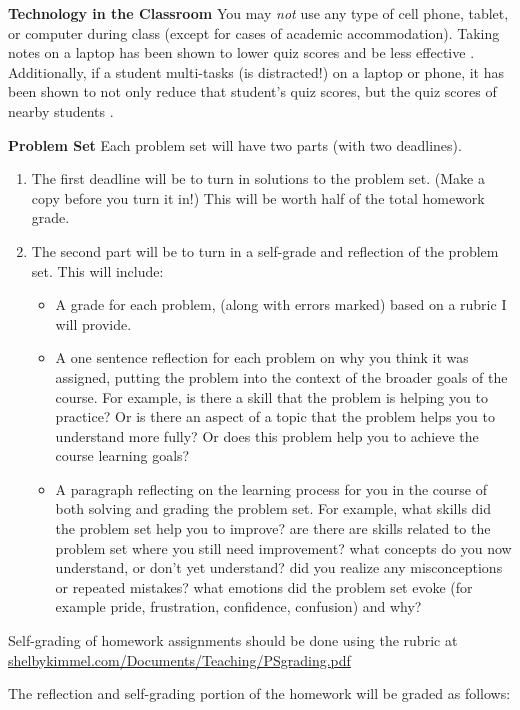 \documentclass[11pt]{article}
\begin{document}
\medskip
{\bf Technology in the Classroom} You may {\it not} use any type of cell phone, tablet, or computer during class (except for cases of academic accommodation). Taking notes on a laptop has been shown to lower quiz scores and be less effective \cite{doi:10.1177/0956797614524581}. Additionally, if a student multi-tasks (is distracted!) on a laptop or phone, it has been shown to not only reduce that student's quiz scores, but the quiz scores of nearby students \cite{Sana201324}.


\medskip

{\bf Problem Set} Each problem set will have two parts (with two deadlines).
\begin{enumerate}
\item The first deadline will be to turn in solutions to the problem set. (Make a copy before you turn it in!) This will be worth half of the total homework grade.
\item The second part will be to turn in a self-grade and reflection of the problem set. This will include:
\begin{itemize}
\item A grade for each problem, (along with errors marked) based on a rubric I will provide.
\item A one sentence reflection for each problem on why you think it was assigned, putting the problem into the context of the broader goals of the course. For example, is there a skill that the problem is helping you to practice? Or is there an aspect of a topic that the problem helps you to understand more fully? Or does this problem help you to achieve the course learning goals?
\item A paragraph reflecting on the learning process for you in the course of both solving and grading the problem set. For example, what skills did the problem set help you to improve? are there are skills related to the problem set where you still need improvement? what concepts do you now understand, or don't yet understand? did you realize any misconceptions or repeated mistakes? what emotions did the problem set evoke (for example pride, frustration, confidence, confusion) and why?
\end{itemize}
\end{enumerate}

Self-grading of homework assignments should be done using the rubric at \url{shelbykimmel.com/Documents/Teaching/PSgrading.pdf}

The reflection and self-grading portion of the homework will be graded as follows:
\end{document}
